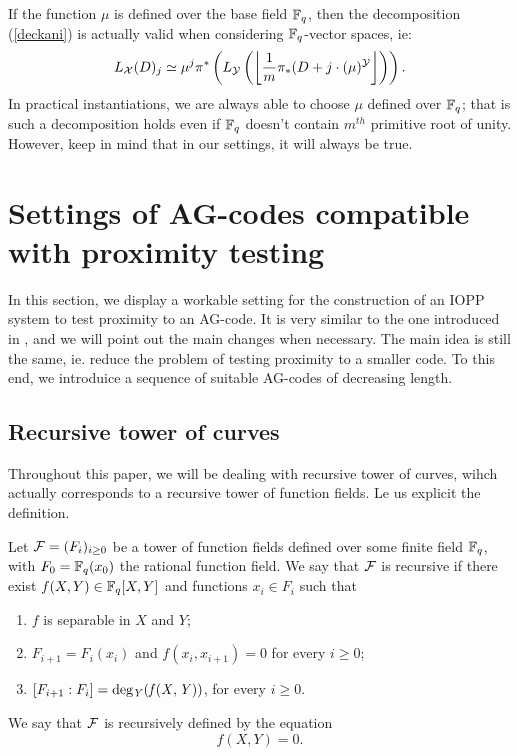 \documentclass[10pt]{article}
\begin{document}
\s

\begin{rq1} \rm
If the function $\mu$ is defined over the base field $\mathbb{F}_q$, then the decomposition (\ref{deckani}) is actually valid when considering $\mathbb{F}_q$-vector spaces, ie:
\[L_{\mathcal{X}}(D)_j \simeq \mu^j\pi^{*}\left(L_{\mathcal{Y}}\left(\left\lfloor \dfrac{1}{m} \pi_*(D+j \cdot (\mu)^{\mathcal{Y}}\right\rfloor \right) \right).\]
In practical instantiations, we are always able to choose $\mu$ defined over $\mathbb{F}_q$; that is such a decomposition holds even if $\mathbb{F}_q$ doesn't contain $m^{th}$ primitive root of unity. However, keep in mind that in our settings, it will always be true.
\end{rq1}

\s

\section{Settings of AG-codes compatible with proximity testing}

\s

In this section, we display a workable setting for the construction of an IOPP system to test proximity to an AG-code. It is very similar to the one introduced in \cite{IOPP}, and we will point out the main changes when necessary. The main idea is still the same, ie. reduce the problem of testing proximity to a smaller code. To this end, we introduice a sequence of suitable AG-codes of decreasing length.

\s

\subsection{Recursive tower of curves}

\s

Throughout this paper, we will be dealing with recursive tower of curves, wihch actually corresponds to a recursive tower of function fields. Le us explicit the definition.

\s

\begin{def1} \label{recursive tower}
Let $\mathcal{F}= (F_i)_{i\geq 0}$ be a tower of function fields defined over some finite field $\mathbb{F}_q$, with $F_0=\mathbb{F}_q(x_0)$ the rational function field. We say that $\mathcal{F}$ is recursive if there exist $f(X,Y) \in \mathbb{F}_q[X,Y]$ and functions $x_i \in F_i$ such that 
\begin{enumerate}
\item $f$ is separable in $X$ and $Y$;
\item $F_{i+1}=F_i(x_i)$ and $f(x_i,x_{i+1})=0$ for every $i \geq 0$;
\item $[F_{i+1}:F_i] = \rm deg_{\it Y} \it (f(X,Y))$, for every $i \geq 0$.
\end{enumerate}
We say that $\mathcal{F}$ is recursively defined by the equation
\[f(X,Y)=0.\]
\end{def1}
\end{document}
